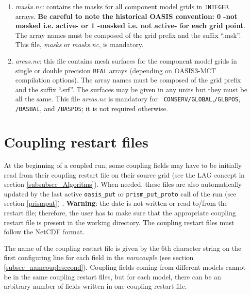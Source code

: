 \begin{enumerate}
\item {\em masks.nc}: contains the masks for all
  component model grids in {\tt INTEGER} arrays. {\bf Be careful to note
  the historical OASIS convention: 0 -not masked i.e.
  active- or 1 -masked i.e. not active- for each grid point}. The
  array names must be composed of the grid prefix and the suffix
  ``.msk''. This file, {\em masks} or {\em masks.nc}, is mandatory.

\item {\em areas.nc}: this file contains mesh surfaces
for the component model grids in single or double precision {\tt REAL}
arrays (depending on OASIS3-MCT compilation options). The array names must be
composed of the grid prefix and the suffix ``.srf''.  The surfaces may
be given in any units but they must be all the same. This file {\em
areas.nc} is mandatory for {\tt
CONSERV/GLOBAL},{\tt /GLBPOS}, {\tt /BASBAL}, and {\tt /BASPOS}; it is not required otherwise.

\end{enumerate}

\section{Coupling restart files}
\label{subsec_restartdata}

At the beginning of a coupled run, some coupling fields may have to be
initially read from their coupling restart file on their source grid
(see the LAG concept in section \ref{subsubsec_Algoritms}). When needed, these files are also automatically
updated by the last active {\tt oasis\_put} or {\tt prism\_put\_proto}
call of the run (see section \ref{prismput}) . 
{\bf Warning}: the date is not written or read to/from the restart file;
therefore, the user has to make sure that the appropriate coupling restart file
is present in the working directory. The coupling restart files must
follow the NetCDF format.


The name of the coupling restart file is
given by the 6th character string on the first configuring line for
each field in the {\it namcouple} (see section
\ref{subsec_namcouplesecond}). Coupling fields coming from different
models cannot be in the same coupling restart files, but for each
model, there can be an arbitrary number of fields written in one
coupling restart file. 

